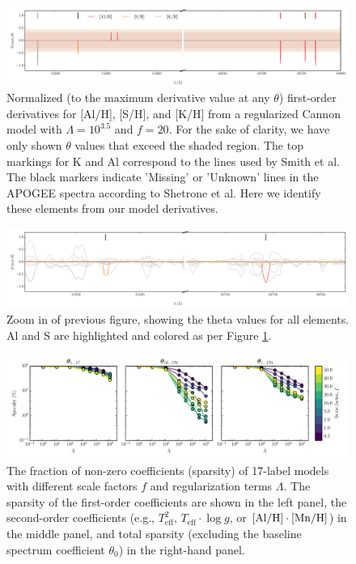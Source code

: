 \documentclass[12pt,preprint]{aastex}
\newcommand{\logg}{\log g}
\newcommand{\Teff}{T_{\mathrm{eff}}}
\begin{document}
\begin{figure}[p]
\includegraphics[width=\textwidth]{sparse-first-order-coefficients.pdf}
\caption{Normalized (to the maximum derivative value at any $\theta$) first-order derivatives for [Al/H], [S/H], and [K/H] from a regularized Cannon model with $\Lambda = 10^{3.5}$ and $f = 20$. For the sake of clarity, we have only shown $\theta$ values that exceed the shaded region. The top markings for K and Al correspond to the lines used by Smith et al. The black markers indicate 'Missing' or 'Unknown' lines in the APOGEE spectra according to Shetrone et al. Here we identify these elements from our model derivatives.  \label{fig:inferring-lines}}
\end{figure}

\begin{figure}[p]
\includegraphics[width=\textwidth]{sparse-first-order-coefficients-zoom.pdf}
\caption{Zoom in of previous figure, showing the theta values for all elements. Al and S are highlighted and colored as per Figure \ref{fig:inferring-lines}.\label{fig:inferring-lines2}}
\end{figure}


\begin{figure}[p]
\includegraphics[width=\textwidth]{sparsity.pdf}
\caption{The fraction of non-zero coefficients (sparsity) of 17-label models with different scale factors $f$ and regularization terms $\Lambda$.  The sparsity of the first-order coefficients are shown in the left panel, the second-order coefficients (e.g., $\Teff^2$, $\Teff\cdot\logg$, or $[\rm{Al}/\rm{H}]\cdot[\rm{Mn}/\rm{H}]$) in the middle panel, and total sparsity (excluding the baseline spectrum coefficient $\theta_0$) in the right-hand panel.\label{fig:sparsity}}
\end{figure}
\end{document}
